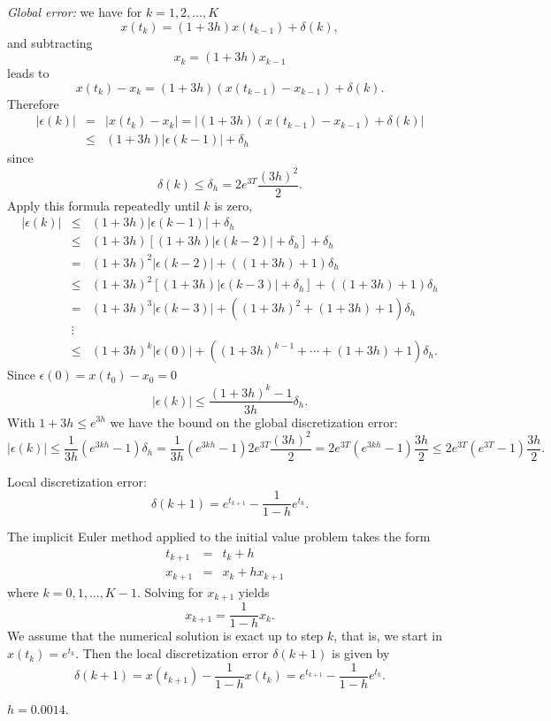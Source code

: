 {\em Global error:} we have for $k=1,2,\ldots,K$
\[
x(t_k)=(1+3h)x(t_{k-1})+\delta(k),
\]
and subtracting
\[
x_k = (1+3h)x_{k-1}
\]
leads to
\[
x(t_k) - x_k = (1+3h)(x(t_{k-1})-x_{k-1})+\delta(k).
\]
Therefore
\begin{eqnarray*}
|\epsilon(k)| & = & |x(t_k) - x_k| =
|(1+3h)(x(t_{k-1})-x_{k-1})+\delta(k)|\\
& \le & (1+3h)|\epsilon(k-1)|+\delta_h
\end{eqnarray*}
since
\[
\delta(k)\le \delta_h = 2e^{3T}\frac{(3h)^2}{2}.
\]
Apply this formula repeatedly until $k$ is zero,
\[
\begin{array}{rcl}
|\epsilon(k)|&\le&(1+3h)|\epsilon(k-1)|+\delta_h\\
&\le& (1+3h)[(1+3h)|\epsilon(k-2)|+\delta_h]+\delta_h\\
&=& (1+3h)^2|\epsilon(k-2)| + ((1+3h) + 1)\delta_h\\
&\le& (1+3h)^2[(1+3h)|\epsilon(k-3)|+\delta_h] + ((1+3h) + 1)\delta_h\\
&=& (1+3h)^3|\epsilon(k-3)| + ((1+3h)^2 + (1+3h) + 1)\delta_h\\
&\vdots& \\
&\le & (1+3h)^k|\epsilon(0)| + ((1+3h)^{k-1} +\cdots + (1+3h) + 1)\delta_h.
\end{array}
\]
Since $\epsilon(0)=x(t_0) - x_0=0$
\[
|\epsilon(k)| \le \frac{(1+3h)^k -1}{3h}\delta_h.
\]
With $1+3h\le e^{3h}$ we have the bound on the global discretization error:
\[
|\epsilon(k)| \le \frac{1}{3h} (e^{3kh}-1)\delta_h=
\frac{1}{3h}(e^{3kh}-1)2e^{3T}\frac{(3h)^2}{2} =
2e^{3T}(e^{3kh}-1)\frac{3h}{2}
\le 2e^{3T}(e^{3T}-1)\frac{3h}{2}.
\]

 \ans Local discretization error:
\[
\delta(k+1) = e^{t_{k+1}} - \frac{1}{1-h} e^{t_k}.
\]

\soln The implicit Euler method applied to the initial value problem
 takes the form
\[
\begin{array}{rclc}
t_{k+1} & = & t_k+h & \\
x_{k+1} & = & x_k + h x_{k+1} &
\end{array}
\]
where $k=0,1,\ldots,K-1$.  Solving for $x_{k+1}$ yields
\[
x_{k+1} = \frac{1}{1-h}x_k.
\]
We assume that the numerical solution is exact up to step $k$, that is,
we start in $x(t_k)=e^{t_k}$.  Then the local discretization error
$\delta(k+1)$ is given by
\[
\delta(k+1) = x(t_{k+1}) - \frac{1}{1-h}x(t_k)=
e^{t_{k+1}} - \frac{1}{1-h}e^{t_k}.
\]

 \ans $h=0.0014$.

